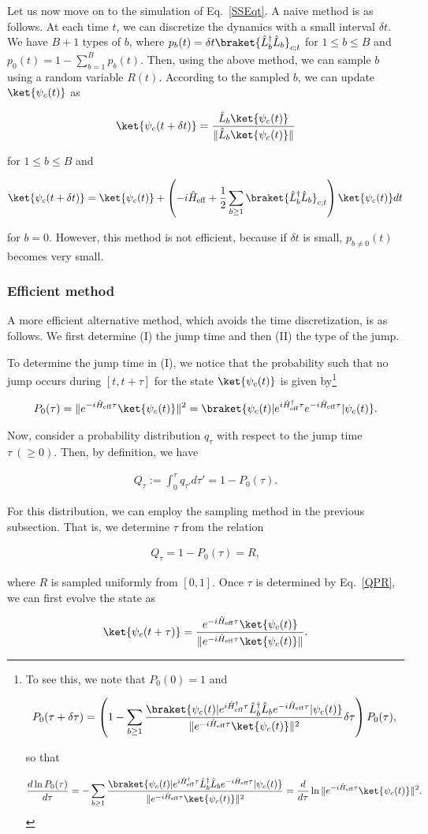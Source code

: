 \documentclass[preprint,pteplogo]{ptephy_v2}%
\numberwithin{equation}{section}
\theoremstyle{definition}
\newcommand{\mr}[1]{\mathrm{#1}}
\newcommand{\lrs}[1]{\left( #1 \right)}
\newcommand{\aln}[1]{
\begin{align}
#1
\end{align}
}
\begin{document}
Let us now move on to the simulation of Eq.~\eqref{SSEqt}.
A naive method is as follows. 
At each time $t$, we can discretize the dynamics with a small interval $\delta t$.
We have $B+1$ types of $b$, where $p_b(t)=\delta t \braket{\hat{L}_b^\dag\hat{L}_b}_{c;t}$ for $1\leq b\leq B$ and 
$p_0(t)=1-\sum_{b=1}^Bp_b(t)$.
Then, using the above method, we can sample $b$  using a random variable $R(t)$.
According to the sampled $b$, we can update $\ket{\psi_c(t)}$ as 
\aln{
\ket{\psi_c(t+\delta t)}=\frac{\hat{L}_b\ket{\psi_c(t)}}{\|\hat{L}_b\ket{\psi_c(t)}\|}
}
for $1\leq b\leq B$ and
\aln{
\ket{\psi_c(t+\delta t)}=\ket{\psi_c(t)}+\lrs{-i\hat{H}_\mr{eff}+\frac{1}{2}\sum_{b\geq 1}\braket{\hat{L}_b^\dag\hat{L}_b}_{c;t}}\ket{\psi_c(t)}dt
}
for $b=0$. 
However, this method is not efficient, because if $\delta t$ is small, $p_{b\neq 0}(t)$  becomes very small.


\subsubsection{Efficient method}
A more efficient alternative method, which avoids the time discretization, is as follows.
We first determine (I) the jump time and then (II) the type of the jump.

To determine the jump time in (I), we notice that the probability such that no jump occurs during $[t,t+\tau]$ for the state $\ket{\psi_c(t)}$ is given by\footnote{
To see this, we note that $P_0(0)=1$ and 
\aln{
P_0(\tau+\delta \tau)=\lrs{1-\sum_{b\geq 1}\frac{\braket{\psi_c(t)|e^{i\hat{H}_\mr{eff}^\dag\tau}\hat{L}_b^\dag\hat{L}_be^{-i\hat{H}_\mr{eff}\tau}|\psi_c(t)}}{\|e^{-i\hat{H}_\mr{eff}\tau}\ket{\psi_c(t)}\|^2}\delta\tau}P_0(\tau),
}
so that
\aln{
\frac{d\ln P_0(\tau)}{d\tau}=-\sum_{b\geq 1}\frac{\braket{\psi_c(t)|e^{i\hat{H}_\mr{eff}^\dag\tau}\hat{L}_b^\dag\hat{L}_be^{-i\hat{H}_\mr{eff}\tau}|\psi_c(t)}}{\|e^{-i\hat{H}_\mr{eff}\tau}\ket{\psi_c(t)}\|^2}=\frac{d}{d\tau}\ln \|e^{-i\hat{H}_\mr{eff}\tau}\ket{\psi_c(t)}\|^2.
}
}
\aln{
P_{0}(\tau)=\|e^{-i\hat{H}_\mr{eff}\tau}\ket{\psi_c(t)}\|^2={\braket{\psi_c(t)|e^{i\hat{H}_\mr{eff}^\dag\tau}e^{-i\hat{H}_\mr{eff}\tau}|\psi_c(t)}}.
}
Now, consider a probability distribution $q_\tau$ with respect to the jump time $\tau\:(\geq 0)$.
Then, by definition, we have
\aln{
Q_\tau:=\int_0^\tau q_{\tau'}d\tau'=1-P_0(\tau).
}
For this distribution, we can employ the sampling method in the previous subsection.
That is, we determine $\tau$ from the relation
\aln{\label{QPR}
Q_\tau=1-P_0(\tau)=R,
}
where $R$ is sampled uniformly from $[0,1]$.
Once $\tau$ is determined by Eq.~\eqref{QPR}, we can first evolve the state as
\aln{
\ket{\psi_c(t+\tau)}=\frac{e^{-i\hat{H}_\mr{eff}\tau}\ket{\psi_c(t)}}{\|e^{-i\hat{H}_\mr{eff}\tau}\ket{\psi_c(t)}\|}.
}
\end{document}
